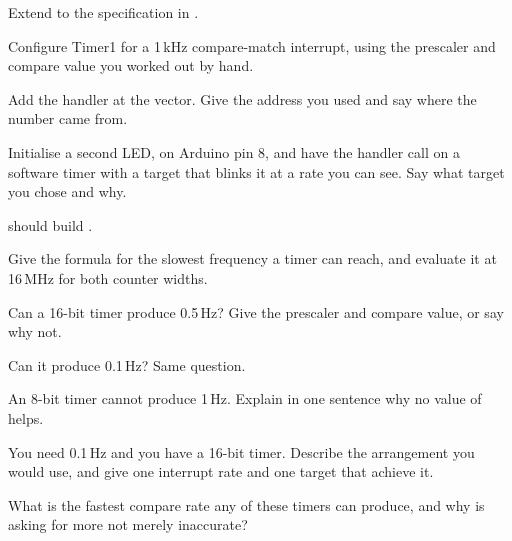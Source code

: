 \label{c5:ex:setup}
Extend  to the specification in .
\begin{parts}
  \item Configure Timer1 for a 1\,kHz compare-match interrupt, using the prescaler and compare
    value you worked out by hand.
  \item Add the handler at the  vector. Give the  address you used
    and say where the number came from.
  \item Initialise a second LED, on Arduino pin 8, and have the handler call  on a
    software timer with a target that blinks it at a rate you can see. Say what target you chose
    and why.
  \item {} should build .
\end{parts}

\label{c5:ex:reach}
\begin{parts}
  \item Give the formula for the slowest frequency a timer can reach, and evaluate it at 16\,MHz for
    both counter widths.
  \item Can a 16-bit timer produce 0.5\,Hz? Give the prescaler and compare value, or say why not.
  \item Can it produce 0.1\,Hz? Same question.
  \item An 8-bit timer cannot produce 1\,Hz. Explain in one sentence why no value of 
    helps.
  \item You need 0.1\,Hz and you have a 16-bit timer. Describe the arrangement you would use, and
    give one interrupt rate and one target that achieve it.
  \item What is the fastest compare rate any of these timers can produce, and why is asking for
    more not merely inaccurate?
\end{parts}


